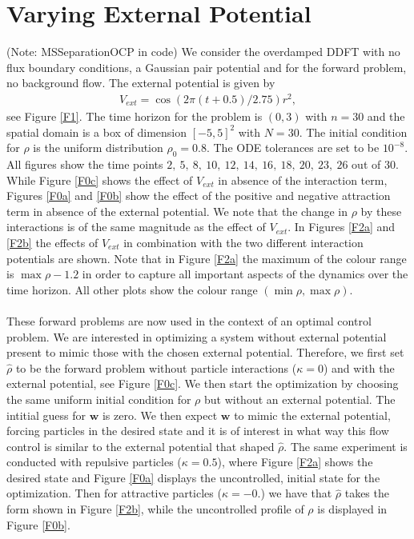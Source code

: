 \documentclass[11pt, a4paper]{article}
\theoremstyle{definition}
\newcommand{\w}{\mathbf{w}}
\newcommand{\hr}{\widehat \rho}
\begin{document}
	
	
	

\section{Varying External Potential}
(Note: MSSeparationOCP in code)
We consider the overdamped DDFT with no flux boundary conditions, a Gaussian pair potential and for the forward problem, no background flow. 
The external potential is given by
\begin{align*}
	V_{ext} =  \cos(2\pi (t + 0.5)/2.75)r^2,
\end{align*}
see Figure \ref{F1}. The time horizon for the problem is $(0,3)$ with $n = 30$ and the spatial domain is a box of dimension $[-5,5]^2$ with $N = 30$. The initial condition for $\rho$ is the uniform distribution $\rho_0 = 0.8$. The ODE tolerances are set to be $10^{-8}$. All figures show the time points $2,\  5,\ 8,\  10,\ 12,\ 14,\ 16,\ 18,\ 20,\ 23,\ 26$ out of $30$.
While Figure \ref{F0c} shows the effect of $V_{ext}$ in absence of the interaction term, Figures \ref{F0a} and \ref{F0b} show the effect of the positive and negative attraction term in absence of the external potential. We note that the change in $\rho$ by these interactions is of the same magnitude as the effect of $V_{ext}$. In Figures \ref{F2a} and \ref{F2b} the effects of $V_{ext}$ in combination with the two different interaction potentials are shown. Note that in Figure \ref{F2a} the maximum of the colour range is $\max \rho - 1.2$ in order to capture all important aspects of the dynamics over the time horizon. All other plots show the colour range $(\min \rho , \max \rho)$.\\
\\
These forward problems are now used in the context of an optimal control problem. We are interested in optimizing a system without external potential present to mimic those with the chosen external potential. Therefore, we first set $\hr$ to be the forward problem without particle interactions ($\kappa =0$) and with the external potential, see Figure \ref{F0c}. We then start the optimization by choosing the same uniform initial condition for $\rho$ but without an external potential. The intitial guess for $\w$ is zero. We then expect $\w$ to mimic the external potential, forcing particles in the desired state and it is of interest in what way this flow control is similar to the external potential that shaped $\hr$.
The same experiment is conducted with repulsive particles ($\kappa = 0.5$), where Figure \ref{F2a} shows the desired state and Figure \ref{F0a} displays the uncontrolled, initial state for the optimization. Then for attractive particles ($\kappa = -0.$) we have that $\hr$ takes the form shown in Figure \ref{F2b}, while the uncontrolled profile of $\rho$ is displayed in Figure \ref{F0b}.\\
\end{document}
